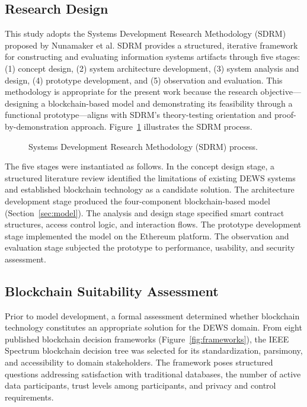 \documentclass[AMA,LATO1COL]{WileyNJD-v2}
\begin{document}
\subsection{Research Design}\label{subsec:design}

This study adopts the Systems Development Research Methodology (SDRM) proposed by Nunamaker et al.\cite{nunamaker1990systems} SDRM provides a structured, iterative framework for constructing and evaluating information systems artifacts through five stages: (1) concept design, (2) system architecture development, (3) system analysis and design, (4) prototype development, and (5) observation and evaluation. This methodology is appropriate for the present work because the research objective---designing a blockchain-based model and demonstrating its feasibility through a functional prototype---aligns with SDRM's theory-testing orientation and proof-by-demonstration approach. Figure~\ref{fig:sdrm} illustrates the SDRM process.

\begin{figure}[!ht]
\centering
{}
\caption{Systems Development Research Methodology (SDRM) process.}\label{fig:sdrm}
\end{figure}

The five stages were instantiated as follows. In the concept design stage, a structured literature review identified the limitations of existing DEWS systems and established blockchain technology as a candidate solution. The architecture development stage produced the four-component blockchain-based model (Section~\ref{sec:model}). The analysis and design stage specified smart contract structures, access control logic, and interaction flows. The prototype development stage implemented the model on the Ethereum platform. The observation and evaluation stage subjected the prototype to performance, usability, and security assessment.

\subsection{Blockchain Suitability Assessment}\label{subsec:suitability}

Prior to model development, a formal assessment determined whether blockchain technology constitutes an appropriate solution for the DEWS domain. From eight published blockchain decision frameworks (Figure~\ref{fig:frameworks}), the IEEE Spectrum blockchain decision tree\cite{peck2017blockchain} was selected for its standardization, parsimony, and accessibility to domain stakeholders. The framework poses structured questions addressing satisfaction with traditional databases, the number of active data participants, trust levels among participants, and privacy and control requirements.
\end{document}
